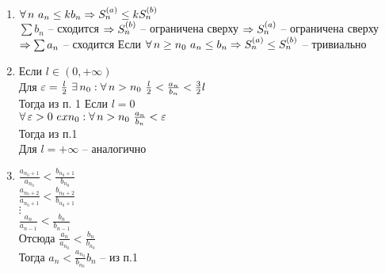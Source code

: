 \documentclass[12pt]{article}
\begin{document}
\begin{enumerate}
    \item $\forall\, n\ a_n \leq k b_n \Rightarrow S_n^{(a)} \leq k S_n^{(b)}$\\
    $\sum b_n$ -- сходится $\Rightarrow S_n^{(b)}$ -- ограничена сверху $\Rightarrow S_n^{(a)}$ -- ограничена сверху $\Rightarrow \sum a_n$ -- сходится
    Если $\forall\, n\geq n_0\ a_n \leq b_n \Rightarrow S_n^{(a)} \leq S_n^{(b)}$ -- тривиально
    \item Если $l \in (0, +\infty)$\\
    Для $\varepsilon =\frac l2\ \exists\, n_0: \forall\, n > n_0\ \frac l2 < \frac{a_n}{b_n} < \frac32 l$\\
    Тогда из п. 1
    Если $l = 0$\\
    $\fall \eps > 0\ ex n_0: \fall n > n_0\ \frac{a_n}{b_n} < \eps$\\
    Тогда из п.1\\
    Для $l=+\infty$ -- аналогично
    \item $\frac{a_{n_0+1}}{a_{n_0}} < \frac{b_{n_0+1}}{b_{n_0}}$\\
    $\frac{a_{n_0+2}}{a_{n_0+1}} < \frac{b_{n_0+2}}{b_{n_0+1}}$\\
    $\vdots$\\
    $\frac{a_n}{a_{n-1}} < \frac{b_n}{b_{n-1}}$\\
    Отсюда $\frac{a_n}{a_{n_0}} < \frac{b_n}{b_{n_0}}$\\
    Тогда $a_n < \frac{a_{n_0}}{b_{n_0}} b_n$ -- из п.1
\end{enumerate}
\end{document}
